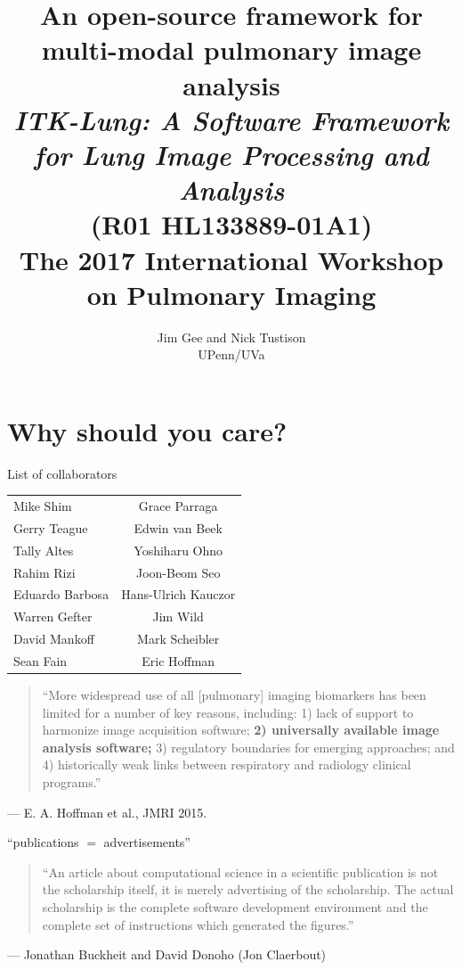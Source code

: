 \documentclass[ignorenonframetext,]{beamer}
\institute{}
\title[Pulmonary open-science imaging]{An open-source framework for multi-modal pulmonary image analysis\\
\vspace{0.5em} \footnotesize  \emph{ITK-Lung: A Software Framework for
Lung Image Processing and Analysis}\\
\footnotesize (R01 HL133889-01A1)\\
\normalsize \vspace{3em} The 2017 International Workshop on Pulmonary
Imaging}
\author{Jim Gee and Nick Tustison\\
\vspace{0.25em} UPenn/UVa}
\date{}
\begin{document}
\frame{\titlepage}

\section{Why should you care?}\label{why-should-you-care}

\begin{frame}{List of collaborators}

\begin{longtable}[c]{@{}lc@{}}
\toprule
Mike Shim & Grace Parraga\tabularnewline
Gerry Teague & Edwin van Beek\tabularnewline
Tally Altes & Yoshiharu Ohno\tabularnewline
Rahim Rizi & Joon-Beom Seo\tabularnewline
Eduardo Barbosa & Hans-Ulrich Kauczor\tabularnewline
Warren Gefter & Jim Wild\tabularnewline
David Mankoff & Mark Scheibler\tabularnewline
Sean Fain & Eric Hoffman\tabularnewline
\bottomrule
\end{longtable}

\end{frame}

\begin{frame}{}

\begin{quote}
``More widespread use of all {[}pulmonary{]} imaging biomarkers has been
limited for a number of key reasons, including: 1) lack of support to
harmonize image acquisition software; \textbf{2) universally available
image analysis software;} 3) regulatory boundaries for emerging
approaches; and 4) historically weak links between respiratory and
radiology clinical programs.''
\end{quote}

\begin{flushright}
--- E. A. Hoffman et al., JMRI 2015.
\end{flushright}

\end{frame}

\begin{frame}{``publications \(=\) advertisements''}

\begin{quote}
``An article about computational science in a scientific publication is
not the scholarship itself, it is merely advertising of the scholarship.
The actual scholarship is the complete software development environment
and the complete set of instructions which generated the figures.''
\end{quote}

\begin{flushright}
 --- Jonathan Buckheit and David Donoho (Jon Claerbout)
\end{flushright}

\end{frame}
\end{document}
